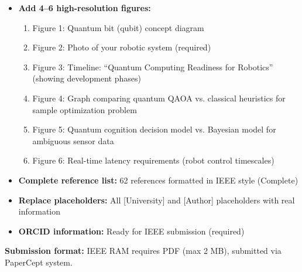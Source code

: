 \documentclass[journal]{IEEEtran}
\begin{document}
\begin{itemize}
\item \textbf{Add 4--6 high-resolution figures:}
\begin{enumerate}
\item Figure 1: Quantum bit (qubit) concept diagram
\item Figure 2: Photo of your robotic system (required)
\item Figure 3: Timeline: ``Quantum Computing Readiness for Robotics'' (showing development phases)
\item Figure 4: Graph comparing quantum QAOA vs. classical heuristics for sample optimization problem
\item Figure 5: Quantum cognition decision model vs. Bayesian model for ambiguous sensor data
\item Figure 6: Real-time latency requirements (robot control timescales)
\end{enumerate}

\item \textbf{Complete reference list:} 62 references formatted in IEEE style (\checkmark Complete)

\item \textbf{Replace placeholders:} All [University] and [Author] placeholders with real information

\item \textbf{ORCID information:} Ready for IEEE submission (required)
\end{itemize}

\textbf{Submission format:} IEEE RAM requires PDF (max 2 MB), submitted via PaperCept system.
\end{document}
